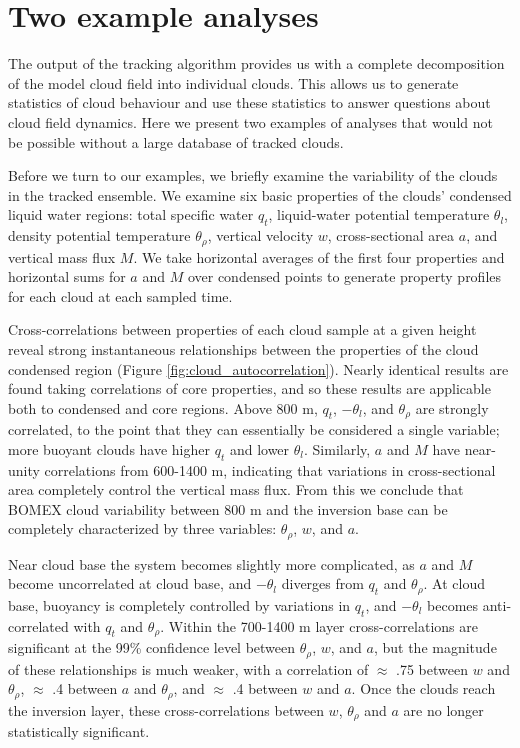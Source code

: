 \documentclass[acp]{copernicus}
\begin{document}

\section{Two example analyses}

The output of the tracking algorithm provides us with a complete decomposition 
of the model cloud field into individual clouds.  This allows us to generate 
statistics of cloud behaviour and use these statistics to answer questions 
about cloud field dynamics.  Here we present two examples of analyses that 
would not be possible without a large database of tracked clouds.

Before we turn to our examples, we briefly examine the variability of the 
clouds in the tracked ensemble.  We examine six basic properties of the 
clouds' condensed liquid water regions: total specific water $q_t$, 
liquid-water potential temperature $\theta_l$, density potential temperature 
$\theta_\rho$, vertical velocity $w$, cross-sectional area $a$, and vertical 
mass flux $M$.  We take horizontal averages of the first four properties and 
horizontal sums for $a$ and $M$ over condensed points to generate property 
profiles for each cloud at each sampled time.

Cross-correlations between properties of each cloud sample at a given height 
reveal strong instantaneous relationships between the properties of the cloud 
condensed region (Figure \ref{fig:cloud_autocorrelation}).  Nearly identical 
results are found taking correlations of core properties, and so these results 
are applicable both to condensed and core regions.  Above 800 m, $q_t$, 
$-\theta_l$, and $\theta_\rho$ are strongly correlated, to the point that 
they can essentially be considered a single variable; more buoyant clouds have 
higher $q_t$ and lower $\theta_l$.  Similarly, $a$ and $M$ have near-unity 
correlations from 600-1400 m, indicating that variations in cross-sectional 
area completely control the vertical mass flux.  From this we conclude that 
BOMEX cloud variability between 800 m and the inversion base can be completely 
characterized by three variables: $\theta_\rho$, $w$, and $a$.  

Near cloud base the system becomes slightly more complicated, as $a$ and $M$ 
become uncorrelated at cloud base, and $-\theta_l$ diverges from $q_t$ and 
$\theta_\rho$.  At cloud base, buoyancy is completely controlled by 
variations in $q_t$, and $-\theta_l$ becomes anti-correlated with $q_t$ and 
$\theta_\rho$.  Within the 700-1400 m layer cross-correlations are 
significant at the 99\% confidence level between $\theta_\rho$, $w$, and $a$, 
but the magnitude of these relationships is much weaker, with a correlation of 
$\approx$ .75 between $w$ and $\theta_\rho$, $\approx$ .4 between $a$ 
and $\theta_\rho$, and $\approx$ .4 between $w$ and $a$.  Once the clouds 
reach the inversion layer, these cross-correlations between $w$, 
$\theta_\rho$ and $a$ are no longer statistically significant.
\end{document}
